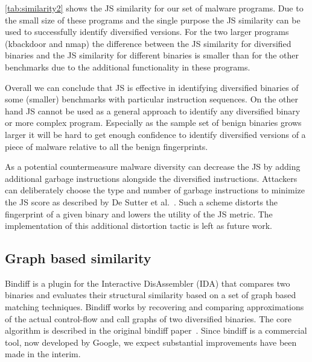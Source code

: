 \documentclass[letterpaper,twocolumn,10pt]{article}
\begin{document}
\autoref{tab:similarity2} shows the JS similarity for our set of malware
programs. Due to the small size of these programs and the single purpose the JS
similarity can be used to successfully identify diversified versions. For the
two larger programs (kbackdoor and nmap) the difference between the JS
similarity for diversified binaries and the JS similarity for different binaries
is smaller than for the other benchmarks due to the additional functionality in
these programs.


Overall we can conclude that JS is effective in identifying diversified binaries
of some (smaller) benchmarks with particular instruction sequences. On the other
hand JS cannot be used as a general approach to identify any diversified binary
or more complex program. Especially as the sample set of benign binaries grows
larger it will be hard to get enough confidence to identify diversified versions
of a piece of malware relative to all the benign fingerprints.

As a potential countermeasure malware diversity can decrease the JS by adding
additional garbage instructions alongside the diversified
instructions. Attackers can deliberately choose the type and number of garbage
instructions to minimize the JS score as described by De Sutter et al.~\cite{desutter.etal+08}.  Such a scheme distorts the fingerprint of a given binary and lowers the 
utility of the JS metric.  The implementation of this additional distortion 
tactic is left as future work.


\subsection{Graph based similarity}\label{sec:bindiff}

Bindiff is a plugin for the Interactive DisAssembler (IDA) that compares two
binaries and evaluates their structural similarity based on a set of graph based
matching techniques.  Bindiff works by recovering and comparing approximations
of the actual control-flow and call graphs of two diversified binaries.  The
core algorithm is described in the original bindiff paper~\cite{flake04dimva}.
Since bindiff is a commercial tool, now developed by Google, we expect
substantial improvements have been made in the interim.
\end{document}
